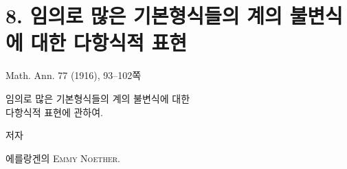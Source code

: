 
\section*{8. 임의로 많은 기본형식들의 계의 불변식에 대한 다항식적 표현}
\begin{center}
Math. Ann. 77 (1916), 93--102쪽
\end{center}

\begin{center}
{\Large 임의로 많은 기본형식들의 계의 불변식에 대한\\
다항식적 표현에 관하여.}\par
\vspace{1.2em}
저자\par
\vspace{0.8em}
에를랑겐의 {\scshape Emmy Noether}.
\end{center}
